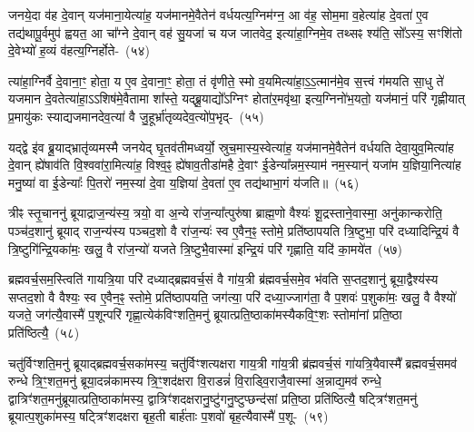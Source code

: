 जनये॒दा व॑ह दे॒वान् यज॑माना॒येत्या॑ह॒ यज॑मानमे॒वैतेन॑ वर्ध\-य\-त्य॒\-ग्नि\-म॑ग्न॒ आ व॑ह॒ सोम॒मा व॒हेत्या॑ह दे॒वता॑ ए॒व तद्य॑थापू॒र्वमुप॑ ह्वयत॒ आ चा᳚ग्ने दे॒वान् वह॑ सु॒यजा॑ च यज जातवेद॒ इत्या॑हा॒ग्निमे॒व तथ्सꣴ श्य॑ति॒ सो᳚\-ऽस्य॒ सꣳशि॑तो दे॒वेभ्यो॑ ह॒व्यं व॑हत्य॒ग्निर्\mbox{}होते-~(५४)\ip

त्या॑हा॒ग्निर्वै दे॒वाना॒ꣳ॒ होता॒ य ए॒व दे॒वाना॒ꣳ॒ होता॒ तं वृ॑णीते॒ स्मो व॒यमित्या॑हा॒\-ऽ॒\-ऽ॒त्मान॑मे॒व स॒त्त्वं ग॑मयति सा॒धु ते॑ यजमान दे॒वतेत्या॑हा॒\-ऽऽ\-शिष॑मे॒वैतामा शा᳚स्ते॒ यद्ब्रू॒याद्यो᳚\-ऽग्निꣳ होता॑र॒मवृ॑था॒ इत्य॒ग्निनो॑भ॒यतो॒ यज॑मानं॒ परि॑ गृह्णीयात् प्र॒मायु॑कः स्याद्यजमानदेव॒त्या॑ वै जु॒हूर्भ्रा॑तृव्यदेव॒त्यो॑प॒भृद्-~(५५)\ip

यद्द्वे इ॑व ब्रू॒याद्भ्रातृ॑व्यमस्मै जनयेद् घृ॒तव॑तीमध्वर्यो॒ स्रुच॒मास्य॒\-स्वे\-त्या॑ह॒ यज॑मानमे॒वैतेन॑ वर्धयति देवा॒युव॒मित्या॑ह दे॒वान् ह्ये॑षा\-व॑ति वि॒श्व\-वा॑रा॒मित्या॑ह॒ विश्व॒ꣴ॒ ह्ये॑षाव॒तीडा॑महै दे॒वाꣳ ई॒डेन्या᳚न्नम॒स्याम॑ नम॒स्यान्॑ यजा॑म य॒ज्ञिया॒नित्या॑ह मनु॒ष्या॑ वा ई॒डेन्याः᳚ पि॒तरो॑ नम॒स्या॑ दे॒वा य॒ज्ञिया॑ दे॒वता॑ ए॒व तद्य॑थाभा॒गं य॑जति॥~(५६)\ip

{\anuvakamend[{विप्रा॑नुमदित॒ इत्या॑ह च॒नास्मै॒ होतो॑प॒भृद्दे॒वता॑ ए॒व त्रीणि॑ च}]}

त्रीꣴ स्तृ॒चाननु॑ ब्रूयाद्राज॒न्य॑स्य॒ त्रयो॒ वा अ॒न्ये रा॑ज॒न्या᳚त्पुरु॑षा ब्राह्म॒णो वैश्यः॑ शू॒द्रस्ताने॒वास्मा॒ अनु॑कान्करोति॒ पञ्च॑द॒शानु॑ ब्रूयाद् राज॒न्य॑स्य पञ्चद॒शो वै रा॑ज॒न्यः॑ स्व ए॒वैन॒ꣴ॒ स्तोमे॒ प्रति॑\-ष्ठापयति त्रि॒ष्टुभा॒ परि॑ दध्यादिन्द्रि॒यं वै त्रि॒ष्टुगि॑न्द्रि॒यका॑मः॒ खलु॒ वै रा॑ज॒न्यो॑ यजते त्रि॒ष्टुभै॒वास्मा॑ इन्द्रि॒यं परि॑ गृह्णाति॒ यदि॑ का॒मये॑त~(५७)\ip

ब्रह्मवर्च॒सम॒स्त्विति॑ गायत्रि॒या परि॑ दध्याद्ब्रह्मवर्च॒सं वै गा॑य॒त्री ब्र॑ह्मवर्च॒समे॒व भ॑वति स॒प्तद॒शानु॑ ब्रूया॒द्वैश्य॑स्य सप्तद॒शो वै वैश्यः॒ स्व ए॒वैन॒ꣴ॒ स्तोमे॒ प्रति॑\-ष्ठापयति॒ जग॑त्या॒ परि॑ दध्या॒ज्जाग॑ता॒ वै प॒शवः॑ प॒शुका॑मः॒ खलु॒ वै वैश्यो॑ यजते॒ जग॑त्यै॒वास्मै॑ प॒शून्परि॑ गृह्णा॒त्येक॑विꣳशति॒मनु॑ ब्रूयात्प्रति॒ष्ठाका॑मस्यैकवि॒ꣳ॒शः स्तोमा॑नां प्रति॒ष्ठा प्रति॑ष्ठित्यै॒~(५८)\ip

चतु॑र्विꣳशति॒मनु॑ ब्रूयाद्ब्रह्मवर्च॒सका॑मस्य॒ चतु॑र्विꣳशत्यक्षरा गाय॒त्री गा॑य॒त्री ब्र॑ह्मवर्च॒सं गा॑यत्रि॒यैवास्मै᳚ ब्रह्मवर्च॒समव॑ रुन्धे त्रि॒ꣳ॒शत॒\-मनु॑ ब्रूया॒दन्न॑कामस्य त्रि॒ꣳ॒शद॑क्षरा वि॒राडन्नं॑ वि॒राड्वि॒रा\-जै॒\-वा\-स्मा॑ अ॒न्नाद्\-य॒\-मव॑ रुन्धे॒ द्वात्रिꣳ॑शत॒\-मनु॑\-ब्रूयात्प्र\-ति॒ष्ठा\-का॑मस्य॒ द्वात्रिꣳ॑शद\-क्षरा\-नु॒ष्टु॑ग\-नु॒ष्टुप्छन्द॑सां प्रति॒ष्ठा प्रति॑ष्ठित्यै॒ षट्त्रिꣳ॑शत॒मनु॑ ब्रूयात्प॒शुका॑मस्य॒ षट्त्रिꣳ॑शदक्षरा बृह॒ती बार्\mbox{}ह॑ताः प॒शवो॑ बृह॒त्यैवास्मै॑ प॒शू-~(५९)\ip

